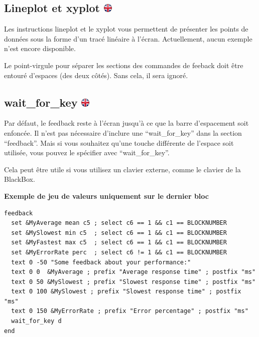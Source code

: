 \documentclass[
]{book}
\begin{document}
\hypertarget{lineplot-et-xyplot-ikflag}{%
\subsection[Lineplot et xyplot ]{\texorpdfstring{Lineplot et xyplot \href{https://www.psytoolkit.org/doc3.1.0/feedback.html\#_lineplot_and_xyplot}{\protect\includegraphics{img/ukflag.png}}}{Lineplot et xyplot ikflag}}\label{lineplot-et-xyplot-ikflag}}

Les instructions lineplot et le xyplot vous permettent de présenter les points de données sous la forme d'un tracé linéaire à l'écran. Actuellement, aucun exemple n'est encore disponible.

Le point-virgule pour séparer les sections des commandes de feeback doit être entouré d'espaces (des deux côtés). Sans cela, il sera ignoré.

\hypertarget{wait_for_key-ikflag}{%
\subsection[wait\_for\_key ]{\texorpdfstring{wait\_for\_key \href{https://www.psytoolkit.org/doc3.1.0/feedback.html\#_wait-for_key}{\protect\includegraphics{img/ukflag.png}}}{wait\_for\_key ikflag}}\label{wait_for_key-ikflag}}

Par défaut, le feedback reste à l'écran jusqu'à ce que la barre d'espacement soit enfoncée. Il n'est pas nécessaire d'inclure une ``wait\_for\_key'' dans la section ``feedback''. Mais si vous souhaitez qu'une touche différente de l'espace soit utilisée, vous pouvez le spécifier avec ``wait\_for\_key''.

Cela peut être utile si vous utilisez un clavier externe, comme le clavier de la BlackBox.

\textbf{Exemple de jeu de valeurs uniquement sur le dernier bloc}

\begin{verbatim}
feedback
  set &MyAverage mean c5 ; select c6 == 1 && c1 == BLOCKNUMBER
  set &MySlowest min c5  ; select c6 == 1 && c1 == BLOCKNUMBER
  set &MyFastest max c5  ; select c6 == 1 && c1 == BLOCKNUMBER
  set &MyErrorRate perc  ; select c6 != 1 && c1 == BLOCKNUMBER
  text 0 -50 "Some feedback about your performance:"
  text 0 0  &MyAverage ; prefix "Average response time" ; postfix "ms"
  text 0 50 &MySlowest ; prefix "Slowest response time" ; postfix "ms"
  text 0 100 &MySlowest ; prefix "Slowest response time" ; postfix "ms"
  text 0 150 &MyErrorRate ; prefix "Error percentage" ; postfix "ms"
  wait_for_key d
end
\end{verbatim}
\end{document}
